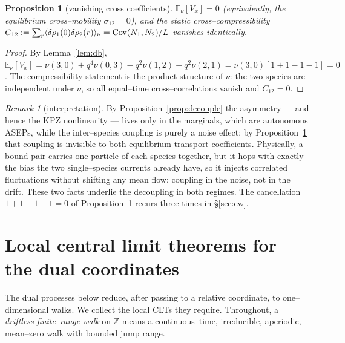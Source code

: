 \documentclass[11pt]{article}
\theoremstyle{plain}
\newtheorem{proposition}[theorem]{Proposition}
\theoremstyle{definition}
\theoremstyle{remark}
\newtheorem{remark}[theorem]{Remark}
\newcommand{\Z}{\mathbb{Z}}\newcommand{\R}{\mathbb{R}}\newcommand{\N}{\mathbb{N}}
\newcommand{\E}{\mathbb{E}}\newcommand{\PP}{\mathbb{P}}\newcommand{\dd}{\,\mathrm{d}}
\begin{document}
\begin{proposition}[vanishing cross coefficients]\label{prop:cross}
$\E_\nu[V_x]=0$ \textup{(}equivalently, the equilibrium cross--mobility
$\sigma_{12}=0$\textup{)}, and the static cross--compressibility
$C_{12}:=\sum_r\langle\delta\rho_1(0)\delta\rho_2(r)\rangle_\nu=\operatorname{Cov}(N_1,N_2)/L$
vanishes identically.
\end{proposition}
\begin{proof}
By Lemma~\ref{lem:db},
$\E_\nu[V_x]=\nu(3,0)+q^4\nu(0,3)-q^2\nu(1,2)-q^2\nu(2,1)=\nu(3,0)[1+1-1-1]=0$. The
compressibility statement is the product structure of $\nu$: the two species are
independent under $\nu$, so all equal--time cross--correlations vanish and $C_{12}=0$.
\end{proof}

\begin{remark}[interpretation]\label{rem:transport}
By Proposition~\ref{prop:decouple} the asymmetry --- and hence the KPZ nonlinearity ---
lives only in the marginals, which are autonomous ASEPs, while the inter--species
coupling is purely a noise effect; by Proposition~\ref{prop:cross} that coupling is
invisible to both equilibrium transport coefficients. Physically, a bound pair carries
one particle of each species together, but it hops with exactly the bias the two
single--species currents already have, so it injects correlated fluctuations without
shifting any mean flow: coupling in the noise, not in the drift. These two facts
underlie the decoupling in both regimes. The cancellation $1+1-1-1=0$ of
Proposition~\ref{prop:cross} recurs three times in \S\ref{sec:ew}.
\end{remark}

\section{Local central limit theorems for the dual coordinates}\label{sec:lclt}

The dual processes below reduce, after passing to a relative coordinate, to
one--dimensional walks. We collect the local CLTs they require. Throughout, a
\emph{driftless finite--range walk} on $\Z$ means a continuous--time, irreducible,
aperiodic, mean--zero walk with bounded jump range.
\end{document}
